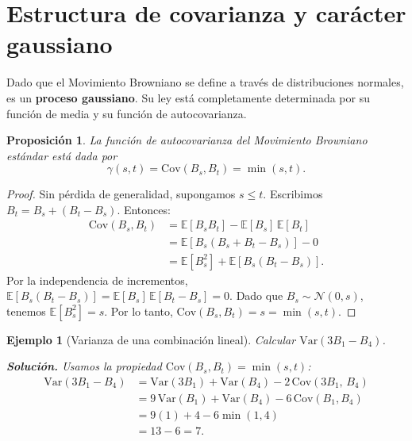 \documentclass[12pt]{book}
\newtheorem{proposition}{Proposición}[chapter]
\newtheorem{example}{Ejemplo}[chapter]
\begin{document}
\section{Estructura de covarianza y carácter gaussiano}

Dado que el Movimiento Browniano se define a través de distribuciones normales, es un \textbf{proceso gaussiano}. Su ley está completamente determinada por su función de media y su función de autocovarianza.

\begin{proposition}
La función de autocovarianza del Movimiento Browniano estándar está dada por
\[
    \gamma(s,t) = \mathrm{Cov}(B_s, B_t) = \min(s,t).
\]
\end{proposition}

\begin{proof}
Sin pérdida de generalidad, supongamos $s \le t$. Escribimos $B_t = B_s + (B_t - B_s)$. Entonces:
\begin{align*}
    \mathrm{Cov}(B_s, B_t) &= \mathbb{E}[B_s B_t] - \mathbb{E}[B_s]\,\mathbb{E}[B_t] \\
    &= \mathbb{E}[B_s(B_s + B_t - B_s)] - 0 \\
    &= \mathbb{E}[B_s^2] + \mathbb{E}[B_s(B_t - B_s)].
\end{align*}
Por la independencia de incrementos, $\mathbb{E}[B_s(B_t - B_s)] = \mathbb{E}[B_s]\,\mathbb{E}[B_t - B_s] = 0$. Dado que $B_s \sim \mathcal{N}(0,s)$, tenemos $\mathbb{E}[B_s^2] = s$. Por lo tanto, $\mathrm{Cov}(B_s, B_t) = s = \min(s,t)$.
\end{proof}

\begin{example}[Varianza de una combinación lineal]
Calcular $\mathrm{Var}(3B_1 - B_4)$.

\textbf{Solución.} Usamos la propiedad $\mathrm{Cov}(B_s, B_t) = \min(s,t)$:
\begin{align*}
    \mathrm{Var}(3B_1 - B_4)
    &= \mathrm{Var}(3B_1) + \mathrm{Var}(B_4) - 2\,\mathrm{Cov}(3B_1,\, B_4) \\
    &= 9\,\mathrm{Var}(B_1) + \mathrm{Var}(B_4) - 6\,\mathrm{Cov}(B_1, B_4) \\
    &= 9(1) + 4 - 6\min(1,4) \\
    &= 13 - 6 = 7.
\end{align*}
\end{example}
\end{document}

